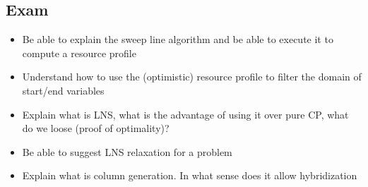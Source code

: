 \subsection{Exam}
\begin{itemize}
    \item  Be able to explain the sweep line algorithm and be
        able to execute it to compute a resource profile
    \item  Understand how to use the (optimistic) resource profile
        to filter the domain of start/end variables
    \item  Explain what is LNS, what is the advantage of using it
        over pure CP, what do we loose (proof of optimality)?
    \item  Be able to suggest LNS relaxation for a problem
    \item  Explain what is column generation. In what sense does
        it allow hybridization
\end{itemize}



